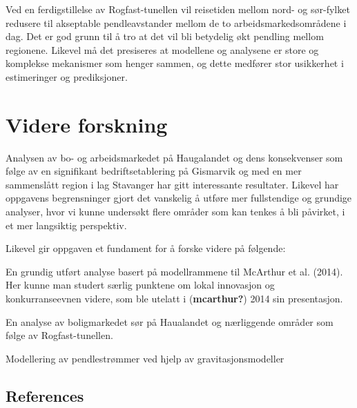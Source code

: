 \documentclass[
]{article}
\begin{document}
Ved en ferdigstillelse av Rogfast-tunellen vil reisetiden mellom nord-
og sør-fylket redusere til akseptable pendleavstander mellom de to
arbeidsmarkedsområdene i dag. Det er god grunn til å tro at det vil bli
betydelig økt pendling mellom regionene. Likevel må det presiseres at
modellene og analysene er store og komplekse mekanismer som henger
sammen, og dette medfører stor usikkerhet i estimeringer og
prediksjoner.

\newpage

\hypertarget{videre-forskning}{%
\section{Videre forskning}\label{videre-forskning}}

Analysen av bo- og arbeidsmarkedet på Haugalandet og dens konsekvenser
som følge av en signifikant bedriftsetablering på Gismarvik og med en
mer sammenslått region i lag Stavanger har gitt interessante resultater.
Likevel har oppgavens begrensninger gjort det vanskelig å utføre mer
fullstendige og grundige analyser, hvor vi kunne undersøkt flere områder
som kan tenkes å bli påvirket, i et mer langsiktig perspektiv.

Likevel gir oppgaven et fundament for å forske videre på følgende:

En grundig utført analyse basert på modellrammene til McArthur et al.
(2014). Her kunne man studert særlig punktene om lokal innovasjon og
konkurranseevnen videre, som ble utelatt i (\textbf{mcarthur?}) 2014 sin
presentasjon.

En analyse av boligmarkedet sør på Haualandet og nærliggende områder som
følge av Rogfast-tunellen.

Modellering av pendlestrømmer ved hjelp av gravitasjonsmodeller

\newpage

\hypertarget{references}{%
\subsection*{References}\label{references}}
\end{document}
